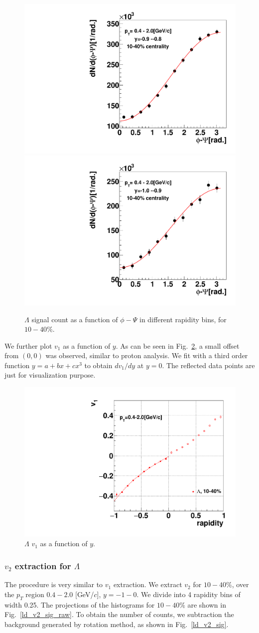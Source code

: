 \begin{figure}[h]
\includegraphics[width=0.19\linewidth]{chapterX/fig/ld_v1_sig/ld_3gev_phi_cent1_pt0_rap13.pdf}
\includegraphics[width=0.19\linewidth]{chapterX/fig/ld_v1_sig/ld_3gev_phi_cent1_pt0_rap14.pdf}
\caption{$\Lambda$ signal count as a function of $\phi-\Psi$ in different rapidity bins, for $10-40\%$.}
\label{ldv1fit1040}
\end{figure}


We further plot $v_{1}$ as a function of $y$. As can be seen in Fig.~\ref{lddv1dyfit1040}, a small offset from $(0,0)$ was observed, similar to proton analysis. We fit with a third order function $y=a+bx+cx^{3}$ to obtain $dv_{1}/dy$ at $y=0$. The reflected data points are just for visualization purpose. 

\begin{figure}[h]
\includegraphics[width=0.5\linewidth]{chapterX/fig/ld_v1_sig/v1vy_centall_ptbin0.pdf}
\caption{$\Lambda$ $v_1$ as a function of $y$.}
\label{lddv1dyfit1040}
\end{figure}



\subsubsection{$v_2$ extraction for $\Lambda$}

The procedure is very similar to $v_1$ extraction. We extract $v_2$ for $10-40\%$, over the $p_{T}$ region $0.4-2.0$ [GeV/$c$], $y=-1 -0$. We divide into 4 rapidity bins of width 0.25. The projections of the histograms for $10-40\%$ are shown in Fig.~\ref{ld_v2_sig_raw}. To obtain the number of counts, we subtraction the background generated by rotation method, as shown in Fig.~\ref{ld_v2_sig}.

